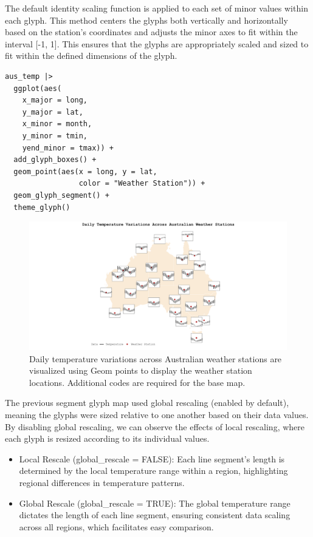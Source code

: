 The default identity scaling function is applied to each set of minor values within each glyph. This method centers the glyphs both vertically and horizontally based on the station's coordinates and adjusts the minor axes to fit within the interval {[}-1, 1{]}. This ensures that the glyphs are appropriately scaled and sized to fit within the defined dimensions of the glyph.

\begin{verbatim}
aus_temp |>
  ggplot(aes(
    x_major = long, 
    y_major = lat, 
    x_minor = month, 
    y_minor = tmin, 
    yend_minor = tmax)) +
  add_glyph_boxes() +
  geom_point(aes(x = long, y = lat,
                 color = "Weather Station")) +
  geom_glyph_segment() +
  theme_glyph()
\end{verbatim}

\begin{figure}
\includegraphics[width=50in]{figures/temp_var} \caption{Daily temperature variations across Australian weather stations are visualized using Geom points to display the weather station locations. Additional codes are required for the base map.}\label{fig:unnamed-chunk-9}
\end{figure}

The previous segment glyph map used global rescaling (enabled by default), meaning the glyphs were sized relative to one another based on their data values. By disabling global rescaling, we can observe the effects of local rescaling, where each glyph is resized according to its individual values.

\begin{itemize}
\tightlist
\item
  Local Rescale (global\_rescale = FALSE): Each line segment's length is determined by the local temperature range within a region, highlighting regional differences in temperature patterns.
\item
  Global Rescale (global\_rescale = TRUE): The global temperature range dictates the length of each line segment, ensuring consistent data scaling across all regions, which facilitates easy comparison.
\end{itemize}

